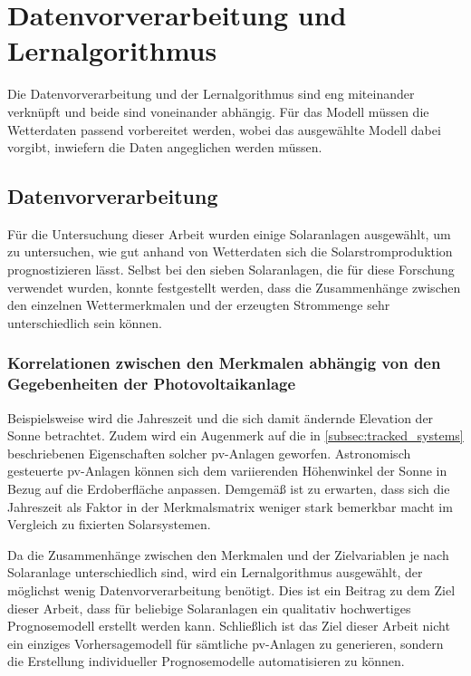 \documentclass[12pt, a4paper]{article}
\newcommand*{\fullref}[1]{\hyperref[{#1}]{\autoref*{#1} \textit{\nameref*{#1}}}}
\begin{document}
\newpage

\section{Datenvorverarbeitung und Lernalgorithmus}
\label{sec:data_algorithm}

Die Datenvorverarbeitung und der Lernalgorithmus sind eng miteinander verknüpft und beide sind voneinander abhängig. Für das Modell müssen die Wetterdaten passend vorbereitet werden, wobei das ausgewählte Modell dabei vorgibt, inwiefern die Daten angeglichen werden müssen. 

\subsection{Datenvorverarbeitung}

Für die Untersuchung dieser Arbeit wurden einige Solaranlagen ausgewählt, um zu untersuchen, wie gut anhand von Wetterdaten sich die Solarstromproduktion prognostizieren lässt. Selbst bei den sieben Solaranlagen, die für diese Forschung verwendet wurden, konnte festgestellt werden, dass die Zusammenhänge zwischen den einzelnen Wettermerkmalen und der erzeugten Strommenge sehr unterschiedlich sein können.

\subsubsection{Korrelationen zwischen den Merkmalen abhängig von den Gegebenheiten der Photovoltaikanlage}

Beispielsweise wird die Jahreszeit und die sich damit ändernde Elevation der Sonne betrachtet. Zudem wird ein Augenmerk auf die in \fullref{subsec:tracked_systems} beschriebenen Eigenschaften solcher \ac{pv}-Anlagen geworfen. Astronomisch gesteuerte \ac{pv}-Anlagen können sich dem variierenden Höhenwinkel der Sonne in Bezug auf die Erdoberfläche anpassen. Demgemäß ist zu erwarten, dass sich die Jahreszeit als Faktor in der Merkmalsmatrix weniger stark bemerkbar macht im Vergleich zu fixierten Solarsystemen. 

Da die Zusammenhänge zwischen den Merkmalen und der Zielvariablen je nach Solaranlage unterschiedlich sind, wird ein Lernalgorithmus ausgewählt, der möglichst wenig Datenvorverarbeitung benötigt. Dies ist ein Beitrag zu dem Ziel dieser Arbeit, dass für beliebige Solaranlagen ein qualitativ hochwertiges Prognosemodell erstellt werden kann. Schließlich ist das Ziel dieser Arbeit nicht ein einziges Vorhersagemodell für sämtliche \ac{pv}-Anlagen zu generieren, sondern die Erstellung individueller Prognosemodelle automatisieren zu können.
\end{document}

